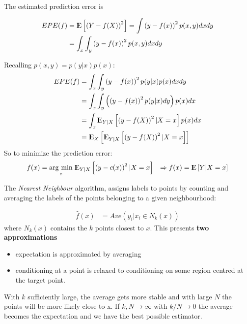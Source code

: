 \documentclass[12pt, letterpaper]{article}
\theoremstyle{definition}
\newcommand{\E}{{\rm I\kern-.3em E}}
\newcommand{\argmin}[1]{\underset{#1}{\operatorname{arg}\,\operatorname{min}}\;}
\begin{document}
The estimated prediction error is 

\begin{equation}
\begin{aligned}
EPE(f) &= \E\left[ \left( Y- f(X) \right)^2 \right] = \int \left( y- f(x) \right)^2 p(x,y) dx dy \\
&= \int_x\int_y \left( y- f(x) \right)^2 p(x,y) dx dy \\
\end{aligned}
\end{equation}

Recalling $p(x,y) = p( y|x) p(x)$:
\begin{equation}
\begin{aligned}
EPE(f) &= \int_x\int_y \left( y- f(x) \right)^2 p(y|x)  p(x) dx dy \\
 &= \int_x \int_y \left( \left( y - f(x) \right)^2 p(y|x) dy\right)  p(x) dx   \\
 &= \int_x \E_{Y|X} \left[ \left( y - f(X) \right)^2 | X=x \right]  p(x) dx   \\
 &= \E_X \left[ \E_{Y|X} \left[ \left( y - f(X) \right)^2 | X=x \right]    \right]   
\end{aligned}
\end{equation}
So to minimize the prediction error:
\begin{align}
f(x) &= \argmin{c} \E_{Y|X} \left[ \left( y - c(x) \right)^2 | X=x \right] 
& \Rightarrow f(x) = \E \left[ Y | X=x \right] 
\end{align}

The \textit{Nearest Neighbour} algorithm, assigns labels to points by counting and averaging the labels of the points belonging to a given neighbourhood:

\begin{align}
\hat{f} (x) &= Ave \left(   y_i|x_i \in N_k(x)   \right)
\end{align}
where $N_k(x) $ contains the $k$ points closest to $x$. This presents \textbf{two approximations}
\begin{itemize}
\item expectation is approximated by averaging
\item conditioning at a point is relaxed to conditioning on some region centred at the target point.
\end{itemize}

With $k$ sufficiently large, the average gets more stable and with large $N$ the points will be more likely close to x. If $k, N \rightarrow \infty$ with $k/N \rightarrow 0$ the average becomes the expectation and we have the best possible estimator.
\end{document}
